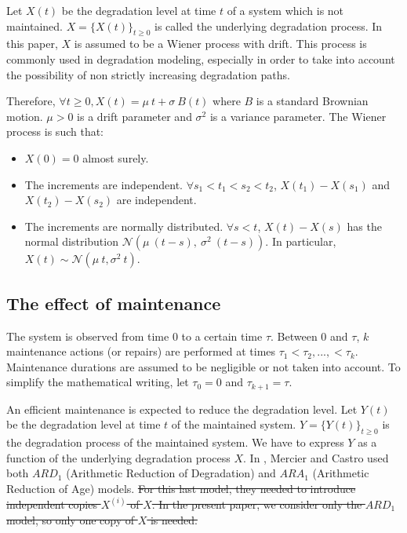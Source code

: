Let $X(t)$ be the degradation level at time $t$ of a system which is not maintained. $X=\{X(t)\}_{t\geq 0}$ is called the underlying degradation process. 
In this paper, $X$ is assumed to be a Wiener process with drift. This process is commonly used in degradation modeling, especially in order to take into account the possibility of non strictly increasing degradation paths.

Therefore, $\forall t \geq 0, X(t)=\mu\ t +\sigma\ B(t)$ where $B$ is a standard Brownian motion. $\mu > 0$ is a drift parameter and $\sigma^2$ is a variance parameter. The Wiener process is such that:

\begin{itemize}

\item $X(0) = 0$ almost surely.

\item The increments are independent. $\forall s_1 < t_1 < s_2 < t_2$, $X(t_1) - X(s_1)$ and $X(t_2) - X(s_2)$ are independent.

\item The increments are normally distributed. $\forall s < t$, $X(t)-X(s)$ has the normal distribution $\mathcal{N}\left(\mu\ (t-s),\ \sigma^2\ (t-s) \right)$. In particular, $X(t)\sim \mathcal{N}(\mu\ t, \sigma^2\ t)$.

\end{itemize}


\subsection{The effect of maintenance} 
\label{section:maintenance}

The system is observed from time 0 to a certain time $\tau$. Between 0 and $\tau$, $k$ maintenance actions (or repairs) are performed at times $\tau_1 <\tau_2,...,<\tau_k$. Maintenance durations are assumed to be negligible or not taken into account. To simplify the mathematical writing, let $\tau_0=0$ and $\tau_{k+1}=\tau$.

An efficient maintenance is expected to reduce the degradation level. Let $Y(t)$ be the degradation level at time $t$ of the maintained system. $Y=\{Y(t)\}_{t\geq 0}$ is the degradation process of the maintained system. We have to express $Y$ as a function of the underlying degradation process $X$. In \cite{mercier_stochastic_2019}, Mercier and Castro used both $ARD_1$ (Arithmetic Reduction of Degradation) and $ARA_1$ (Arithmetic Reduction of Age) models. \st{For this last model, they needed to introduce independent copies $X^{(i)}$ of $X$. In the present paper, we consider only the $ARD_1$ model, so only one copy of $X$ is needed.}

